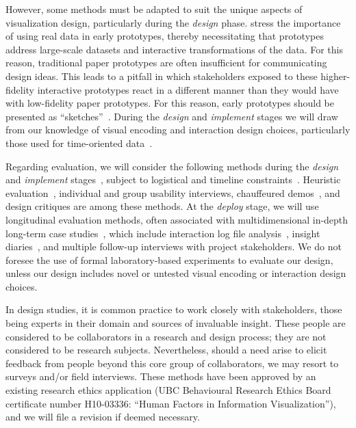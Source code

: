 However, some methods must be adapted to suit the unique aspects of visualization design, particularly during the {\it design} phase. 
\citet{Lloyd2011} stress the importance of using real data in early prototypes, thereby necessitating that prototypes address large-scale datasets and interactive transformations of the data. 
For this reason, traditional paper prototypes are often insufficient for communicating design ideas. 
This leads to a pitfall in which stakeholders exposed to these higher-fidelity interactive prototypes react in a different manner than they would have with low-fidelity paper prototypes. 
For this reason, early prototypes should be presented as ``sketches''~\cite{Wood2012}. 
During the {\it design} and {\it implement} stages we will draw from our knowledge of visual encoding and interaction design choices, particularly those used for time-oriented data~\cite{Aigner2011}.

Regarding evaluation, we will consider the following methods during the {\it design} and {\it implement} stages~\cite{Lam2012}, subject to logistical and timeline constraints~\cite{Sedlmair2011}. 
Heuristic evaluation~\cite{Nielsen1990}, individual and group usability interviews, chauffeured demos~\cite{Lloyd2011}, and design critiques are among these methods. 
At the {\it deploy} stage, we will use longitudinal evaluation methods, often associated with multidimensional in-depth long-term case studies~\cite{Shneiderman2006}, which include interaction log file analysis~\cite{Pohl2010}, insight diaries~\cite{North2011}, and multiple follow-up interviews with project stakeholders. 
We do not foresee the use of formal laboratory-based experiments to evaluate our design, unless our design includes novel or untested visual encoding or interaction design choices.

In design studies, it is common practice to work closely with stakeholders, those being experts in their domain and sources of invaluable insight. 
These people are considered to be collaborators in a research and design process; they are not considered to be research subjects. 
Nevertheless, should a need arise to elicit feedback from people beyond this core group of collaborators, we may resort to surveys and/or field interviews. 
These methods have been approved by an existing research ethics application (UBC Behavioural Research Ethics Board certificate number H10-03336: “Human Factors in Information Visualization”), and we will file a revision if deemed necessary.

